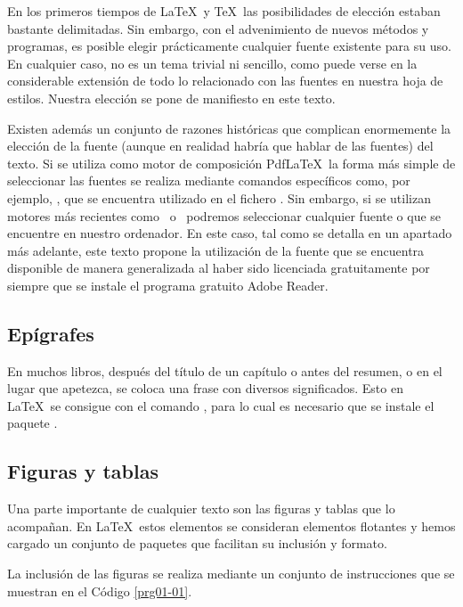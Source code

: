 En los primeros tiempos de \LaTeX\ y \TeX\ las posibilidades de elección estaban bastante delimitadas. Sin embargo, con el advenimiento de nuevos métodos y programas, es posible elegir prácticamente cualquier fuente existente para su uso. En cualquier caso, no es un tema trivial ni sencillo, como puede verse en la considerable extensión de todo lo relacionado con las fuentes en nuestra hoja de estilos. Nuestra elección se pone de manifiesto en este texto.

Existen además un conjunto de razones históricas que complican enormemente la elección de la fuente (aunque en realidad habría que hablar de las fuentes) del texto. Si se utiliza como motor de composición Pdf\LaTeX\, la forma más simple de seleccionar las fuentes se realiza mediante comandos específicos como, por ejemplo,  , que se encuentra utilizado en el fichero .  Sin embargo, si se utilizan motores más recientes como \XeLaTeX\ o \LuaLaTeX\, podremos seleccionar cualquier fuente  o  que se encuentre en nuestro ordenador. En este caso, tal  como se detalla en un apartado más adelante, este texto propone la utilización de la fuente  que se encuentra disponible de manera generalizada al haber sido licenciada gratuitamente por \tsp{\textregistered} siempre que se instale el programa gratuito Adobe Reader. 

\subsection{Epígrafes}
En muchos libros, después del título de un capítulo o antes del resumen, o en el lugar que apetezca, se coloca una frase con diversos significados. Esto en \LaTeX\ se consigue con el comando , para lo cual es necesario que se instale el paquete . %

\subsection{Figuras y tablas}
Una parte importante de cualquier texto son las figuras y tablas que lo acompañan. En \LaTeX\  estos elementos se consideran elementos flotantes y hemos cargado un conjunto de paquetes que facilitan su inclusión y formato.

La inclusión de las figuras se realiza mediante un conjunto de instrucciones que se muestran en  el Código \ref{prg01-01}.

